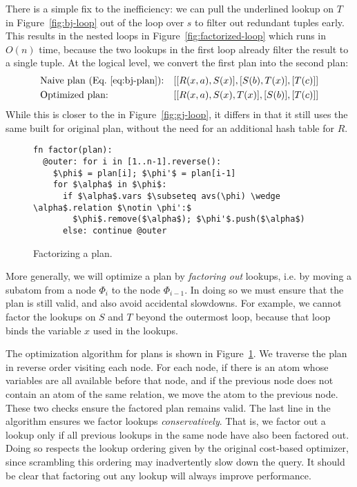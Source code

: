 There is a simple fix to the inefficiency: we can pull the underlined
lookup on $T$ in Figure~\ref{fig:bj-loop} out of the loop over $s$ to
filter out redundant tuples early.  This results in the nested loops
in Figure~\ref{fig:factorized-loop} which runs in $O(n)$ time, because
the two lookups in the first loop already filter the result to a
single tuple.  At the logical level, we convert the first \FJ plan
into the second \FJ plan:
  \begin{align*}
&\mbox{Naive plan (Eq.~\eqref{eq:bj-plan}):}&& [[R(x, a), S(x)], [S(b), T(x)], [T(c)]]\\
&\mbox{Optimized plan:} && [[R(x, a), S(x), T(x)], [S(b)], [T(c)]]
  \end{align*}
  While this is closer to the \GJ in Figure~\ref{fig:gj-loop}, it
  differs in that it still uses the same \GHTs built for original
  plan, without the need for an additional hash table for $R$.

\begin{figure}
  \begin{lstlisting}
fn factor(plan):
  @outer: for i in [1..n-1].reverse():
    $\phi$ = plan[i]; $\phi'$ = plan[i-1]
    for $\alpha$ in $\phi$:
      if $\alpha$.vars $\subseteq avs(\phi) \wedge \alpha$.relation $\notin \phi':$
        $\phi$.remove($\alpha$); $\phi'$.push($\alpha$)
      else: continue @outer
\end{lstlisting}
  \caption{Factorizing a \FJ plan.}
  \label{fig:factorize-plan}
\end{figure}

More generally, we will optimize a \FJ plan by \emph{factoring out}
lookups, i.e. by moving a subatom from a node $\Phi_i$ to the node
$\Phi_{i-1}$.  In doing so we must ensure that the plan is still
valid, and also avoid accidental slowdowns.  For example, we cannot
factor the lookups on $S$ and $T$ beyond the outermost loop, because
that loop binds the variable $x$ used in the lookups.

The optimization algorithm for \FJ plans is shown in
Figure~\ref{fig:factorize-plan}. We traverse the plan in reverse order
visiting each node. For each node, if there is an atom whose variables
are all available before that node, and if the previous node does not
contain an atom of the same relation, we move the atom to the previous
node. These two checks ensure the factored plan remains valid.  The
last line in the algorithm ensures we factor lookups
\emph{conservatively}. That is, we factor out a lookup only if all
previous lookups in the same node have also been factored out. Doing
so respects the lookup ordering given by the original cost-based
optimizer, since scrambling this ordering may inadvertently slow down
the query. It should be clear that factoring out any lookup will always improve
performance.


